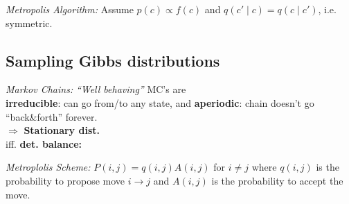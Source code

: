 \emph{Metropolis Algorithm:}\enspace
Assume $p(c) \propto f(c)$ and $q(c'\mid c) = q(c\mid c')$, i.e. symmetric.


\iffalse
    \subsection{Sampling Gibbs distributions}
    
    \emph{Markov Chains:}
    \textit{``Well behaving''} MC's are\\
    \textbf{irreducible}: can go from/to any state, and
    \textbf{aperiodic}: chain doesn't go ``back\&forth'' forever. %
    \\$\Rightarrow$
    \textbf{Stationary dist.} \\ %
    iff. \textbf{det. balance:}  %
    
    \emph{Metroplolis Scheme:}
    $P(i,j) = q(i,j) A(i,j)$ for $i\neq j$ where $q(i,j)$ is the probability to propose move $i\to j$ and $A(i,j)$ is the probability to accept the move.
    
